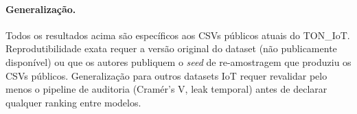 \paragraph{Generalização.}
Todos os resultados acima são específicos aos CSVs públicos atuais
do TON\_IoT. Reprodutibilidade exata requer a versão original do
dataset (não publicamente disponível) ou que os autores publiquem o
\emph{seed} de re-amostragem que produziu os CSVs públicos.
Generalização para outros datasets IoT requer revalidar pelo menos
o pipeline de auditoria (Cramér's V, leak temporal) antes de
declarar qualquer ranking entre modelos.
